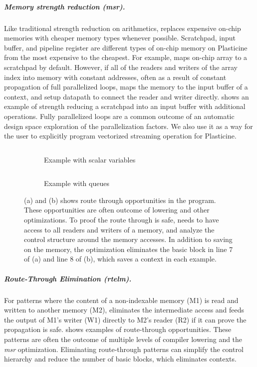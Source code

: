\subparagraph{Memory strength reduction (msr).} Like traditional strength reduction on arithmetics,
\name{} replaces expensive on-chip memories with cheaper memory types whenever possible.
Scratchpad, input buffer, and pipeline register are different types of on-chip memory on Plasticine from
the most expensive to the cheapest.
For example, \name maps on-chip array to a scratchpad by default. However, if all of the readers and
writers of the array index into memory with constant addresses, often as a result of constant propagation of full
parallelized loops, \name maps the memory to the input buffer of a context, and setup datapath to
connect the reader and writer directly.
 shows an example of strength reducing a scratchpad into an input buffer with additional
operations.
Fully parallelized loops are a common outcome of an automatic design space exploration of the parallelization factors.
We also use it as a way for the user to explicitly program vectorized streaming operation for
Plasticine.

\begin{figure}
\centering
\hfill
\begin{subfigure}[b]{0.35\textwidth}
\inputminted{python}{code/rteg1.py}
\caption{Example with scalar variables}
\end{subfigure}
\hfill
\begin{subfigure}[b]{0.4\textwidth}
\inputminted{python}{code/rteg2.py}
\caption{Example with queues}
\end{subfigure}
\hfill
\caption[Examples of route through elimination]{
  (a) and (b) shows route through opportunities in the program.
  These opportunities are often outcome of lowering and other optimizations. To proof the route
  through is safe, \name needs to have access to all readers and writers of a memory, and analyze
  the control structure around the memory accesses.
  In addition to saving on the memory, the optimization eliminates the basic block in line 7 of (a)
  and line 8 of (b), which saves a context in each example.
}
\label{fig:rtelm}
\end{figure}

\subparagraph{Route-Through Elimination (rtelm).} 
For patterns where the content of a non-indexable memory (M1) is read and written to another memory
(M2), \name{} eliminates the intermediate access and feeds the output of M1's writer (W1) directly to M2's
reader (R2) if it can prove the propagation is safe.
 shows examples of route-through opportunities.
These patterns are often the
outcome of multiple levels of compiler lowering and the \emph{msr} optimization. 
Eliminating route-through patterns can simplify the control hierarchy and reduce the number of basic blocks, which eliminates contexts.

